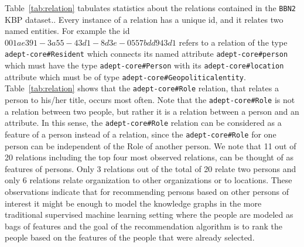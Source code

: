 \documentclass[paper=a4,fontsize=11pt]{scrartcl}
\newcommand{\Tabref}[1]{Table~\ref{#1}}
\numberwithin{equation}{section}    %
\numberwithin{figure}{section}      %
\numberwithin{table}{section}       %
\renewcommand{\cite}[1]{\textcolor{red}{#1}}
\newcommand{\dataset}[0]{\texttt{BBN2} KBP dataset.}
\begin{document}
\Tabref{tab:relation} tabulates statistics about the relations contained in the \dataset.
Every instance of a relation has a unique id, and it relates two named entities.
For example the id $001ae391-3a55-43d1-8d3e-0557bdd943d1$ refers to a relation of the
type \texttt{adept-core\#Resident} which connects its named attribute \texttt{adept-core\#person}
which must have the type \texttt{adept-core\#Person}
with its \texttt{adept-core\#location} attribute which must be of type
\texttt{adept-core\#Geopoliticalentity}.
\Tabref{tab:relation} shows that the \texttt{adept-core\#Role} relation,
that relates a person to his/her title, occurs most often.
Note that the \texttt{adept-core\#Role} is not a relation between two people, but rather
it is a relation between a person and an attribute.
In this sense, the \texttt{adept-core\#Role} relation can be considered as a feature of a person
instead of a relation, since the \texttt{adept-core\#Role} for one person can be
independent of the Role of another person.
We note that 11 out of 20 relations including the top four most observed relations,
can be thought of as features of persons.
Only 3 relations out of the total of 20 relate two persons and
only 6 relations relate organization to other organizations or to locations.
These observations indicate that for recommending persons based on other persons of interest
it might be enough to model the knowledge graphs in the more traditional supervised machine
learning setting where the people are modeled as bags of features and the goal of the
recommendation algorithm is to rank the people based on the features of the people
that were already selected.
\end{document}
